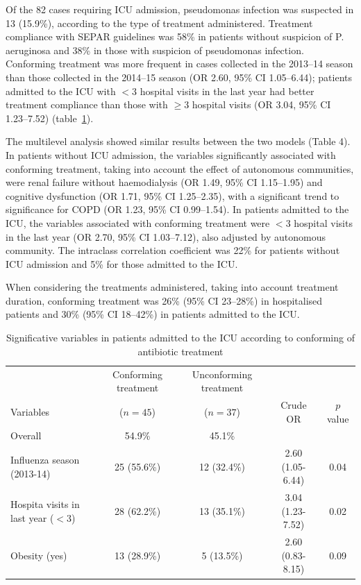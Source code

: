 \documentclass[11pt, a4paper]{article}
\begin{document}
\begin{multicols}{2}

Of the 82 cases requiring ICU admission, pseudomonas infection was suspected in 13 (15.9\%), according to the type of treatment administered. Treatment compliance with SEPAR guidelines was 58\% in patients without suspicion of P. aeruginosa and 38\% in those with suspicion of pseudomonas infection. Conforming treatment was more frequent in cases collected in the 2013–14 season than those collected in the 2014–15 season (OR 2.60, 95\% CI 1.05–6.44); patients admitted to the ICU with $<3$ hospital visits in the last year had better treatment compliance than those with $\geq3$ hospital visits (OR 3.04, 95\% CI 1.23–7.52) (table~\ref{tab:tabla_uci}).

The multilevel analysis showed similar results between the two models (Table 4). In patients without ICU admission, the variables significantly associated with conforming treatment, taking into account the effect of autonomous communities, were renal failure without haemodialysis (OR 1.49, 95\% CI 1.15–1.95) and cognitive dysfunction (OR 1.71, 95\% CI 1.25–2.35), with a significant trend to significance for COPD (OR 1.23, 95\% CI 0.99–1.54). In patients admitted to the ICU, the variables associated with conforming treatment were $<3$ hospital visits in the last year (OR 2.70, 95\% CI 1.03–7.12), also adjusted by autonomous community. The intraclass correlation coefficient was 22\% for patients without ICU admission and 5\% for those admitted to the ICU.

When considering the treatments administered, taking into account treatment duration, conforming treatment was 26\% (95\% CI 23–28\%) in hospitalised patients and 30\% (95\% CI 18–42\%) in patients admitted to the ICU.

\end{multicols}

\begin{table}[hbt!]
\centering
\scalebox{0.85}
{
\begin{tabular}{lcccc}
\hline
& Conforming treatment & Unconforming treatment & & \\
Variables & ($n=45$) & ($n=37$) & Crude OR & $p$ value \\
\hline
Overall
& 54.9\%
& 45.1\%
& & \\
Influenza season (2013-14) 
& 25 (55.6\%)
& 12 (32.4\%) 
& 2.60 (1.05-6.44)
& 0.04 \\
Hospita visits in last year ($<3$)
& 28 (62.2\%)
& 13 (35.1\%) 
& 3.04 (1.23-7.52)
& 0.02 \\ 
Obesity (yes)
& 13 (28.9\%)
& 5 (13.5\%)
& 2.60 (0.83-8.15)
& 0.09 \\
\hline
\end{tabular}
}
\caption{\footnotesize Significative variables in patients admitted to the ICU according to conforming of antibiotic treatment}
\label{tab:tabla_uci}
\end{table}
\end{document}
